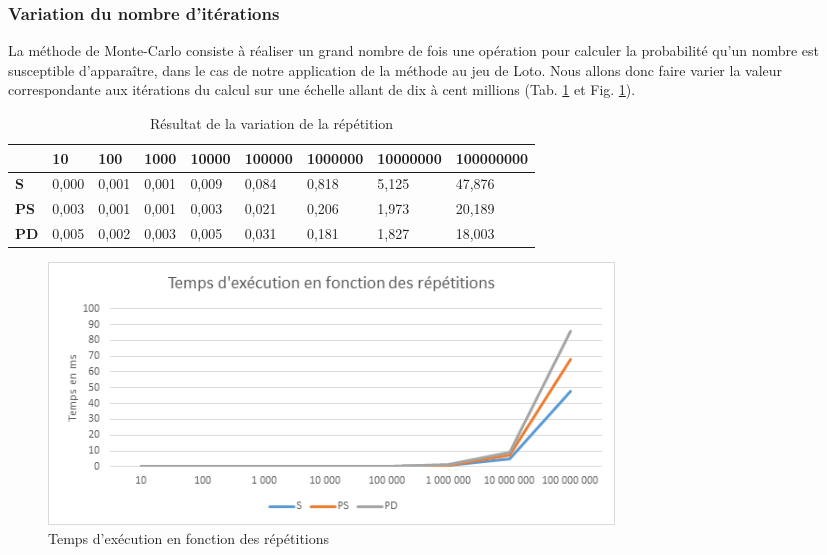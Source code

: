 \documentclass[a4paper,12pt]{article}
\begin{document}
\subsubsection{Variation du nombre d'itérations}
La méthode de Monte-Carlo consiste à réaliser un grand nombre de fois une opération pour calculer la probabilité qu'un nombre est susceptible d'apparaître, dans le cas de notre application de la méthode au jeu de Loto. Nous allons donc faire varier la valeur correspondante aux itérations du calcul sur une échelle allant de dix à cent millions (Tab. \ref{tab:tempsexec1} et Fig. \ref{fig:tempsexec1}).\\

\begin{table}[H]
\caption{Résultat de la variation de la répétition}
\label{tab:tempsexec1}
\begin{tabular}{|l|l|l|l|l|l|l|l|l|}
\hline
            & \textbf{10} & \textbf{100} & \textbf{1000} & \textbf{10000} & \textbf{100000} & \textbf{1000000} & \textbf{10000000} & \textbf{100000000} \\ \hline
\textbf{S}  & 0,000       & 0,001        & 0,001          & 0,009           & 0,084           & 0,818              & 5,125               & 47,876               \\ \hline
\textbf{PS} & 0,003       & 0,001        & 0,001          & 0,003           & 0,021           & 0,206              & 1,973               & 20,189               \\ \hline
\textbf{PD} & 0,005       & 0,002        & 0,003          & 0,005           & 0,031           & 0,181              & 1,827               & 18,003               \\ \hline
\end{tabular}
\end{table}

\begin{figure}[H]
\center \includegraphics[width=15cm]{exec1}
\caption{Temps d'exécution en fonction des répétitions}
\label{fig:tempsexec1}
\end{figure}
\end{document}
